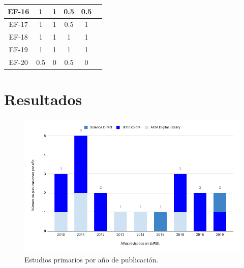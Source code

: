 \documentclass[conference,onecolumn,10pt]{IEEEtran}
\begin{document}
\begin{table}[]
\begin{tabular}{|c|c|c|c|c|l|l|}
                \rowcolor[HTML]{FFFFFF} 
                EF-16                         & 1                        & 1                        & 0.5                      & 0.5                      & \multicolumn{2}{l|}{\cellcolor[HTML]{FFFFFF}} \\ \hline
                \rowcolor[HTML]{FFFFFF} 
                EF-17                         & 1                        & 1                        & 0.5                      & 1                        & \multicolumn{2}{l|}{\cellcolor[HTML]{FFFFFF}} \\ \hline
                \rowcolor[HTML]{FFFFFF} 
                EF-18                         & 1                        & 1                        & 1                        & 1                        & \multicolumn{2}{l|}{\cellcolor[HTML]{FFFFFF}} \\ \hline
                \rowcolor[HTML]{FFFFFF} 
                EF-19                         & 1                        & 1                        & 1                        & 1                        & \multicolumn{2}{l|}{\cellcolor[HTML]{FFFFFF}} \\ \hline
                \rowcolor[HTML]{FFFFFF} 
                EF-20                         & 0.5                      & 0                        & 0.5                      & 0                        & \multicolumn{2}{l|}{\cellcolor[HTML]{FFFFFF}} \\ \hline
        \end{tabular}
\end{table}

\newpage

\section{Resultados}

\begin{figure}[!htb]
   \includegraphics[width=\linewidth]{chart.png}
   \caption{Estudios primarios por año de publicación.}
   \label{fig:estudiostotales}
\end{figure}
\end{document}
